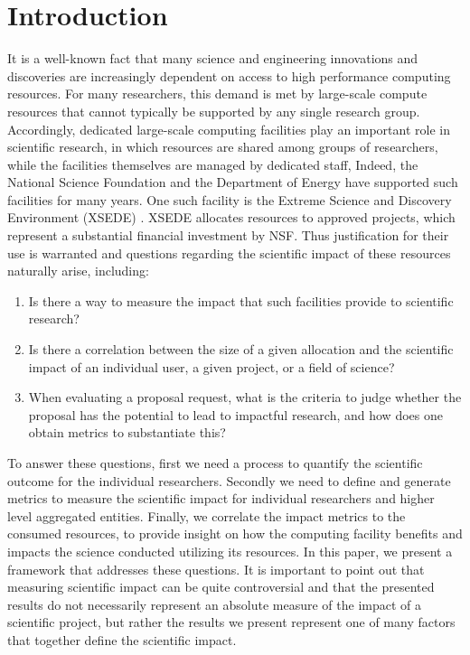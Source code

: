 \documentclass{sig-alternate}
\begin{document}
\section{Introduction} 

It is a well-known fact that many science and engineering innovations and discoveries are increasingly dependent on access to high performance computing resources. For many researchers, this demand is met by large-scale compute resources that cannot typically be supported by any single research group. Accordingly, dedicated large-scale computing facilities play an important role in scientific research, in which resources are shared among groups of researchers, while the facilities themselves are managed by dedicated staff, Indeed, the National Science Foundation and the Department of Energy have supported such facilities for many years. One such facility is the Extreme Science and Discovery Environment (XSEDE) \cite{www-xsede}. XSEDE allocates resources to approved projects, which represent a substantial financial investment by NSF. Thus justification for their use is warranted and questions regarding the scientific impact of these resources naturally arise, including:

\begin{enumerate}

\item Is there a way to measure the impact that such facilities provide to scientific research?

 \item Is there a correlation between the size of a given allocation and the scientific impact of an individual user, a given project, or a field of science?

\item When evaluating a proposal request, what is the criteria to judge whether the proposal has the potential to lead to impactful research, and how does one obtain metrics to substantiate this?

\end{enumerate} 

To answer these questions, first we need a process to quantify the scientific outcome for the individual researchers. Secondly we need to define and generate metrics to measure the scientific impact for individual researchers and higher level aggregated entities. Finally, we correlate the impact metrics to the consumed resources, to provide insight on how the computing facility benefits and impacts the science conducted utilizing its resources. In this paper, we present a framework that addresses these questions. It is important to point out that measuring scientific impact can be quite controversial and that the presented results do not necessarily represent an absolute measure of the impact of a scientific project, but rather the results we present represent one of many factors that together define the scientific impact.
\end{document}
